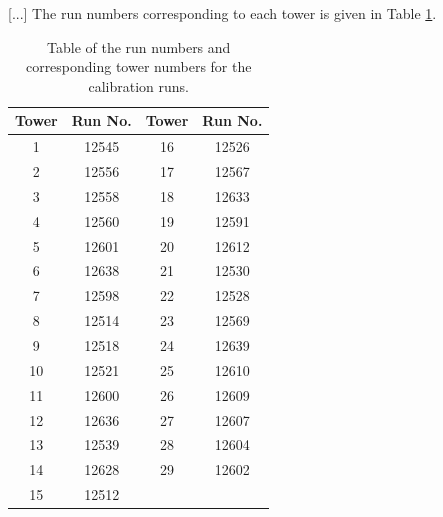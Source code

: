 [...] The run numbers corresponding to each tower is given in Table \ref{table:idea/calibrationruns}.

\begin{table}[h]
\centering
	\begin{tabular}{ c c | c c }
	\hline \hline
	\textbf{Tower} & \textbf{Run No.} & \textbf{Tower} & \textbf{Run No.} \\ \hline \hline
	 1 & 12545 & 16 & 12526 \\
	 2 & 12556 & 17 & 12567 \\
	 3 & 12558 & 18 & 12633 \\
	 4 & 12560 & 19 & 12591 \\
	 5 & 12601 & 20 & 12612 \\
	 6 & 12638 & 21 & 12530 \\
	 7 & 12598 & 22 & 12528 \\
	 8 & 12514 & 23 & 12569 \\
	 9 & 12518 & 24 & 12639 \\
	10 & 12521 & 25 & 12610 \\
	11 & 12600 & 26 & 12609 \\
	12 & 12636 & 27 & 12607 \\
	13 & 12539 & 28 & 12604 \\
	14 & 12628 & 29 & 12602 \\
	15 & 12512 &    &    \\ \hline
	\end{tabular}
	\caption{Table of the run numbers and corresponding tower numbers for the calibration runs.}
	\label{table:idea/calibrationruns}
\end{table}

